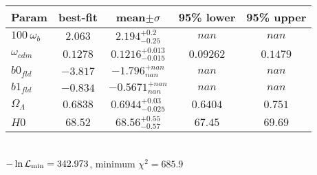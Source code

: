 \begin{tabular}{|l|c|c|c|c|} 
 \hline 
Param & best-fit & mean$\pm\sigma$ & 95\% lower & 95\% upper \\ \hline 
$100~\omega_{b }$ &$2.063$ & $2.194_{-0.25}^{+0.2}$ & $nan$ & $nan$ \\ 
$\omega_{cdm }$ &$0.1278$ & $0.1216_{-0.015}^{+0.013}$ & $0.09262$ & $0.1479$ \\ 
$b0_{fld }$ &$-3.817$ & $-1.796_{nan}^{+nan}$ & $nan$ & $nan$ \\ 
$b1_{fld }$ &$-0.834$ & $-0.5671_{nan}^{+nan}$ & $nan$ & $nan$ \\ 
$\Omega_{\Lambda }$ &$0.6838$ & $0.6944_{-0.025}^{+0.03}$ & $0.6404$ & $0.751$ \\ 
$H0$ &$68.52$ & $68.56_{-0.57}^{+0.55}$ & $67.45$ & $69.69$ \\ 
\hline 
 \end{tabular} \\ 
$-\ln{\cal L}_\mathrm{min} =342.973$, minimum $\chi^2=685.9$ \\ 
